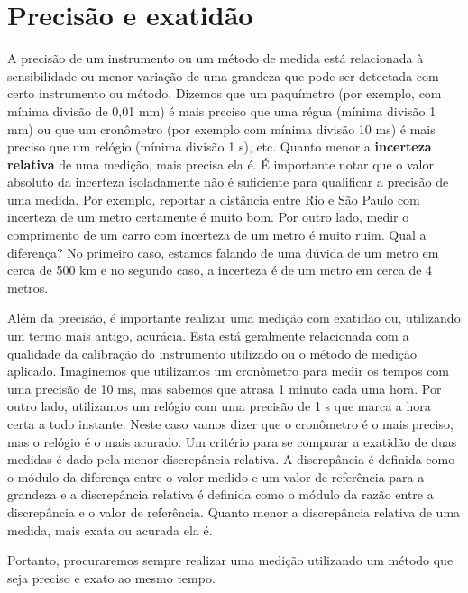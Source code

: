 \section*{Precisão e exatidão}

A precisão de um instrumento ou um método de medida está relacionada à sensibilidade ou menor variação de uma grandeza que pode ser detectada com certo instrumento ou método. Dizemos que um paquímetro (por exemplo, com mínima divisão de 0,01 mm) é mais preciso que uma régua (mínima divisão 1 mm) ou que um cronômetro (por exemplo com mínima divisão 10 ms) é mais preciso que um relógio (mínima divisão 1 s), etc. Quanto menor a {\bf incerteza relativa} de uma medição, mais precisa ela é. É importante notar que o valor absoluto da incerteza isoladamente não  é suficiente para qualificar a precisão de uma medida. Por exemplo, reportar a distância entre Rio e São Paulo com incerteza de um metro certamente é muito bom. Por outro lado, medir o comprimento de um carro com incerteza de um metro é muito ruim. Qual a diferença? No primeiro caso, estamos falando de uma dúvida de um metro em cerca de 500 km e no segundo caso, a incerteza é de um metro em cerca de 4 metros.

Além da precisão, é importante realizar uma medição com exatidão ou, utilizando um termo mais antigo, acurácia. Esta está geralmente relacionada com a qualidade da calibração do instrumento utilizado ou o método de medição aplicado. Imaginemos que utilizamos um cronômetro para medir os tempos com uma precisão de 10 ms, mas sabemos que atrasa 1 minuto cada uma hora. Por outro lado, utilizamos um relógio com uma precisão de 1 s que marca a hora certa a todo instante. Neste caso vamos dizer que o cronômetro é o mais preciso, mas o relógio é o mais acurado. Um critério para se comparar a exatidão de duas medidas é dado pela menor discrepância relativa. A discrepância é definida como o módulo da diferença entre o valor medido e um valor de referência para a grandeza e a discrepância relativa é definida como o módulo da razão entre a discrepância e o valor de referência. Quanto menor a discrepância relativa de uma medida, mais exata ou acurada ela é.

Portanto, procuraremos sempre realizar uma medição utilizando um método que seja preciso e exato ao mesmo tempo.

